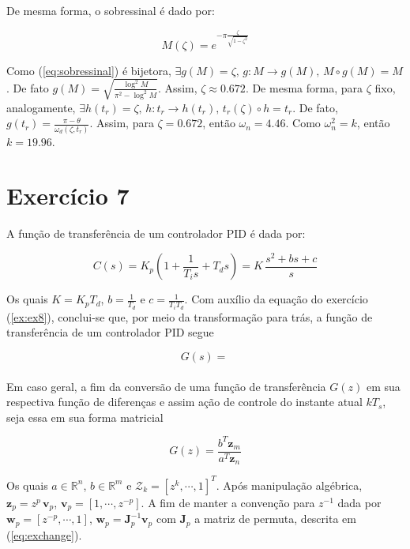 \documentclass{article}
\begin{document}
De mesma forma, o sobressinal é dado por:

\begin{equation}
\label{eq:sobressinal}
M(\zeta) = e^{-\pi \frac{\zeta}{\sqrt{1-\zeta^2}}}
\end{equation}

Como (\ref{eq:sobressinal}) é bijetora, $\exists g(M) = \zeta \mbox{, } g: M \rightarrow g(M) \mbox{, } M \circ g (M) = M$. De fato $g(M) = \sqrt{\frac{\log^2{M}}{\pi^2 - \log^2{M}}}$. Assim, $\zeta \approx 0.672$. De mesma forma, para $\zeta$ fixo, analogamente, $\exists h(t_r) = \zeta\mbox{, }h: t_r \rightarrow h(t_r)\mbox{, } t_r(\zeta) \circ h = t_r$. De fato, $g(t_r) = \frac{\pi - \theta}{\omega_d(\zeta, t_r)}$. Assim, para $\zeta = 0.672$, então $\omega_n = 4.46$.  Como $\omega_n^2 = k$, então $k = 19.96$.

\section*{Exercício 7}

A função de transferência de um controlador PID é dada por:

\begin{equation}
C(s) = K_p\left(1 + \frac{1}{T_i s} + T_d s\right) = K \, \frac{s^2 + b s + c}{s}
\end{equation}

Os quais $K = K_p T_d $, $b = \frac{1}{T_d}$ e $c = \frac{1}{T_i T_d}$. Com auxílio da equação do exercício (\ref{ex:ex8}), conclui-se que, por meio da transformação para trás, a função de transferência de um controlador PID segue

\begin{equation}
G(s) = \frac{}{}
\end{equation}

Em caso geral, a fim da conversão de uma função de transferência $G(z)$ em sua respectiva função de diferenças e assim ação de controle do instante atual $kT_s$, seja essa em sua forma matricial

\begin{equation}
G(z) = \frac{b^T \textbf{z}_m}{a^T \textbf{z}_n}    
\label{eq:Gz}
\end{equation}

Os quais $a \in \mathbb{R}^n$, $b \in \mathbb{R}^m$ e $\mathcal{Z}_k = \left[z^k, \cdots, 1\right]^T$. Após manipulação algébrica, $\textbf{z}_p = z^p \, \textbf{v}_p$, $\textbf{v}_p = [1, \cdots, z^{-p}]$. A fim de manter a convenção para $z^{-1}$ dada por $\textbf{w}_p =  [z^{-p}, \cdots, 1]$, $\textbf{w}_p = \textbf{J}_p^{-1} \textbf{v}_p$ com $\textbf{J}_p$ a matriz de permuta, descrita em (\ref{eq:exchange}).
\end{document}
